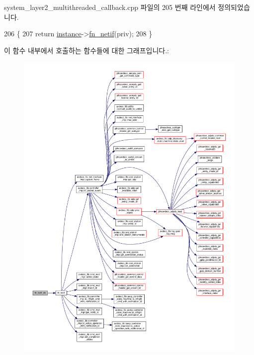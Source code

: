 system\+\_\+layer2\+\_\+multithreaded\+\_\+callback.\+cpp 파일의 205 번째 라인에서 정의되었습니다.


\begin{DoxyCode}
206 \{
207     \textcolor{keywordflow}{return} \hyperlink{classavdecc__lib_1_1system__layer2__multithreaded__callback_a085719c035aa7d479dea20f36118da82}{instance}->\hyperlink{classavdecc__lib_1_1system__layer2__multithreaded__callback_a5f2abae24cc383c43a31ca88ffcebab1}{fn\_netif}(priv);
208 \}
\end{DoxyCode}


이 함수 내부에서 호출하는 함수들에 대한 그래프입니다.\+:
\nopagebreak
\begin{figure}[H]
\begin{center}
\leavevmode
\includegraphics[width=350pt]{classavdecc__lib_1_1system__layer2__multithreaded__callback_a63fb99460e4c14516895f7143b1d54ff_cgraph}
\end{center}
\end{figure}




